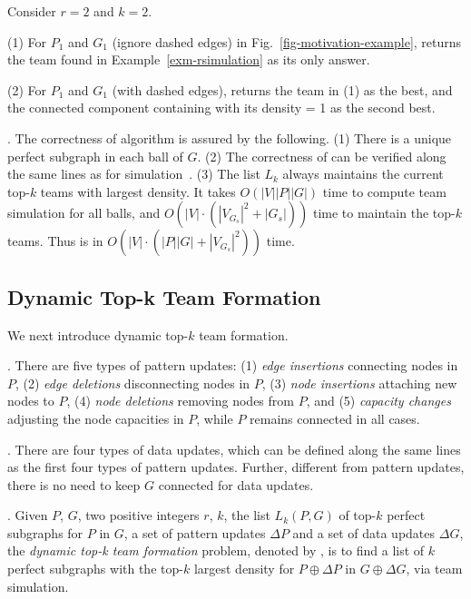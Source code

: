 {\begin{example}
\label{exa-alg-batch} Consider $r=2$ and $k=2$.

\sstab(1) For $P_1$ and $G_1$ (ignore dashed edges) in Fig.~\ref{fig-motivation-example},
 \grouprec returns the team found in Example~\ref{exm-rsimulation} as its only answer.

\sstab(2) For $P_1$ and $G_1$ (with dashed edges), \grouprec returns the team in (1) as the best,
and the connected component containing  with its density = 1 as the second best.
\end{example}


. The correctness of algorithm \grouprec is assured by the following.
(1) There is a unique perfect subgraph in each ball of $G$.
(2) The correctness of \rgraphsim can be verified along the same lines as for simulation~\cite{infsimu95}.
(3) The list $L_{k}$ always maintains the current top-$k$ teams with largest density.
It takes $O(|V||P||G|)$ time to compute team simulation for all balls,
and $O(|V|\cdot(|V_{G_s}|^2+|G_s|))$ time to maintain the top-$k$ teams.
Thus \grouprec is in $O(|V|\cdot(|P||G|+|V_{G_s}|^2))$ time.
}%


\subsection{Dynamic Top-k Team Formation}
\label{subsec-dynteamF}

We next introduce dynamic top-$k$ team formation.

. There are five types of pattern updates:
%
(1) {\em edge insertions} connecting nodes in $P$,
%
(2) {\em edge deletions} disconnecting nodes in $P$,
%
(3) {\em node insertions} attaching new nodes to $P$,
%
(4) {\em node deletions} removing nodes from $P$, and
%
(5) {\em capacity changes} adjusting the node capacities in $P$,
%
while $P$  remains connected in all cases.


. There are four types of data updates, which can be
defined along the same lines as the first four types of pattern updates.
Further, different from pattern updates, there is no need to keep $G$ connected for data updates.


. Given $P$, $G$, two positive integers $r$, $k$, the list $L_{k}(P,G)$ of top-$k$ perfect subgraphs for $P$ in $G$,
a set of pattern updates $\Delta P$ and a set of data updates $\Delta G$,
the {\em dynamic top-k team formation} problem, denoted by ,
is to find a list of $k$ perfect subgraphs with the top-$k$ largest density for $P\oplus\Delta P$ in $G\oplus\Delta G$, via team simulation.

